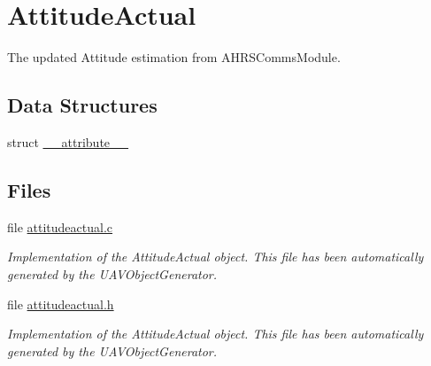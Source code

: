 \hypertarget{group___attitude_actual}{\section{\-Attitude\-Actual}
\label{group___attitude_actual}
}


\-The updated \-Attitude estimation from \-A\-H\-R\-S\-Comms\-Module.  


\subsection*{\-Data \-Structures}
\begin{DoxyCompactItemize}
\item 
struct \hyperlink{struct____attribute____}{\-\_\-\-\_\-attribute\-\_\-\-\_\-}
\end{DoxyCompactItemize}
\subsection*{\-Files}
\begin{DoxyCompactItemize}
\item 
file \hyperlink{attitudeactual_8c}{attitudeactual.\-c}
\begin{DoxyCompactList}\small\item\em \-Implementation of the \-Attitude\-Actual object. \-This file has been automatically generated by the \-U\-A\-V\-Object\-Generator. \end{DoxyCompactList}\item 
file \hyperlink{attitudeactual_8h}{attitudeactual.\-h}
\begin{DoxyCompactList}\small\item\em \-Implementation of the \-Attitude\-Actual object. \-This file has been automatically generated by the \-U\-A\-V\-Object\-Generator. \end{DoxyCompactList}\end{DoxyCompactItemize}
